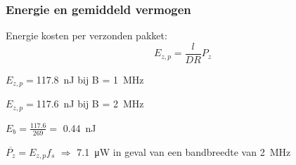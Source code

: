 \begin{frame}
    \frametitle{Energie en gemiddeld vermogen}

    Energie kosten per verzonden pakket:
    \begin{equation*}
        E_{z,p}=\frac{l}{DR}P_z
    \end{equation*}

    \pause

    $E_{z,p}=$\qty{117.8}{\nano\joule} bij B = \qty{1}{\mega\hertz}

    $E_{z,p}=$\qty{117.6}{\nano\joule} bij B = \qty{2}{\mega\hertz} 

    $E_{b}=\frac{117.6}{269}=$ \qty{0.44}{\nano\joule} 

    


    \pause

    \vspace{1cm}
    $\overline{P_z}=E_{z,p}f_s$ $\Rightarrow$ \qty{7.1}{\micro\watt} in geval van een bandbreedte van \qty{2}{\mega\hertz}

\end{frame}